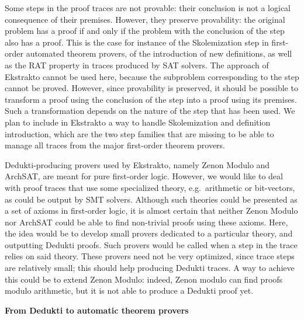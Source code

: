 \begin{description}
\begin{compactenum}
\item  Some steps in the proof traces are not provable: their conclusion is
  not a logical consequence of their premises. However, they preserve
  provability: the original problem has a proof if and only if the
  problem with the conclusion of the step also has a proof. This is the
  case for instance of the Skolemization step in first-order automated
  theorem provers, of the introduction of new definitions, as well as
  the RAT property in traces produced by SAT solvers. The approach of
  Ekstrakto cannot be used here, because the subproblem corresponding to
  the step cannot be proved. However, since provability is preserved, it
  should be possible to transform a
  proof using the conclusion of the step into a proof using its
  premises. Such a transformation depends on the nature of the step that
  has been used. We plan to include in Ekstrakto a way to handle
  Skolemization and definition introduction, which are the two step
  families that are missing to be able to manage all traces from the
  major first-order theorem provers.


\item  Dedukti-producing provers used by Ekstrakto, namely Zenon Modulo and
  ArchSAT, are meant for pure first-order logic. However, we would like
  to deal with proof traces that use some specialized theory,
  e.g.\ arithmetic or bit-vectors, as could be output by SMT
  solvers. Although such theories could be presented as a set of axioms
  in first-order logic, it is almost certain that neither Zenon Modulo
  nor ArchSAT could be able to find non-trivial proofs using these
  axioms. Here, the idea would be to develop small provers dedicated to
  a particular theory, and outputting Dedukti proofs. Such provers would
  be called when a step in the trace relies on said theory. These
  provers need not be very optimized, since trace steps are relatively
  small; this should help producing Dedukti traces. A way to achieve
  this could be to extend Zenon Modulo: indeed, Zenon modulo can find
  proofs modulo arithmetic, but it is not able to produce a Dedukti
  proof yet.

\end{compactenum}
  
\end{description}

\noindent
{\bf \large From Dedukti to automatic theorem provers}

